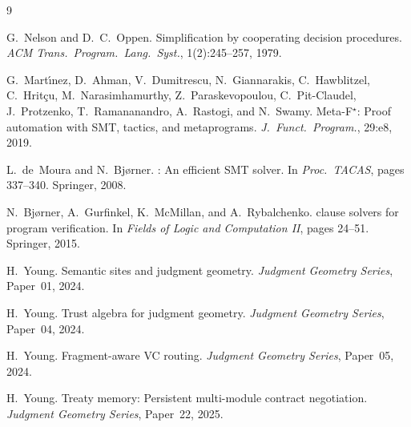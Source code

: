 \documentclass[11pt]{article}
\begin{document}
\begin{thebibliography}{9}

G.~Nelson and D.~C.~Oppen.
\newblock Simplification by cooperating decision procedures.
\newblock \textit{ACM Trans.\ Program.\ Lang.\ Syst.}, 1(2):245--257, 1979.

G.~Mart\'{\i}nez, D.~Ahman, V.~Dumitrescu, N.~Giannarakis, C.~Hawblitzel,
C.~Hrit\c{c}u, M.~Narasimhamurthy, Z.~Paraskevopoulou, C.~Pit-Claudel,
J.~Protzenko, T.~Ramananandro, A.~Rastogi, and N.~Swamy.
\newblock Meta-{F}$^\star$: Proof automation with SMT, tactics, and
metaprograms.
\newblock \textit{J.\ Funct.\ Program.}, 29:e8, 2019.

L.\ de~Moura and N.~Bj\o{}rner.
: An efficient {SMT} solver.
\newblock In \textit{Proc.\ TACAS}, pages 337--340. Springer, 2008.

N.~Bj\o{}rner, A.~Gurfinkel, K.~McMillan, and A.~Rybalchenko.
 clause solvers for program verification.
\newblock In \textit{Fields of Logic and Computation II}, pages 24--51.
Springer, 2015.

H.~Young.
\newblock Semantic sites and judgment geometry.
\newblock \textit{Judgment Geometry Series}, Paper~01, 2024.

H.~Young.
\newblock Trust algebra for judgment geometry.
\newblock \textit{Judgment Geometry Series}, Paper~04, 2024.

H.~Young.
\newblock Fragment-aware {VC} routing.
\newblock \textit{Judgment Geometry Series}, Paper~05, 2024.

H.~Young.
\newblock Treaty memory: Persistent multi-module contract negotiation.
\newblock \textit{Judgment Geometry Series}, Paper~22, 2025.

\end{thebibliography}
\end{document}
